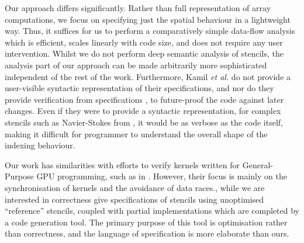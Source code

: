 Our approach differs significantly. Rather than full representation of
array computations, we focus on specifying just the spatial behaviour
in a lightweight way.  Thus, it suffices for us to perform a
comparatively simple data-flow analysis which is efficient, scales
linearly with code size, and does not require any user intervention.
Whilst we do not perform deep semantic analysis of stencils, the
analysis part of our approach can be made arbitrarily more
sophisticated independent of the rest of the work.
%
Furthermore, Kamil \emph{et al.} do not provide a user-visible syntactic
representation of their specifications, and nor do they provide verification
from specifications \eg{}, to future-proof the code against later changes. Even
if they were to provide a syntactic representation, for complex stencils such as
Navier-Stokes from , it would be as verbose as the code
itself, making it difficult for programmer to understand the overall shape of
the indexing behaviour.

Our work has similarities with efforts to verify kernels written for
General-Purpose GPU programming, such as in \citet{Blom:2014:SoCP}.
However, their focus is mainly on the synchronisation of kernels and the
avoidance of data races., while we are interested in correctness
%
\citet{Solar-Lezama:2007:PLDI} give specifications of stencils using unoptimised
``reference'' stencils, coupled with partial implementations which are completed
by a code generation tool. %
The primary purpose of this tool is optimisation rather than correctness, and
the language of specification is more elaborate than ours.

